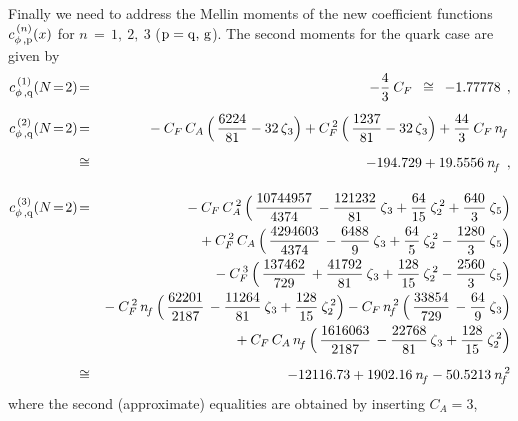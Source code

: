 \documentclass[12pt]{article}
\newcommand{\bea}{\begin{eqnarray}}
\newcommand{\eea}{\end{eqnarray}}
\newcommand{\nn}{\nonumber}
\begin{document}
Finally we need to address the Mellin moments of the new coefficient functions
$c^{\,(n)}_{\rm \phi\, , p}(x)$ for $n\,=\, 1,\:2,\:3$ ($\rm p = q,\,g$).  
The second moments for the quark case are given by
%
\bea
\label{eq:cq1N2}
 c_{\rm \phi\, , q}^{\,(1)} (N\!=\!2) &\! = \! &
        - {4 \over 3}\: \* \cf
 \:\;\cong\:\;  - 1.77778
 \:\: , \\[2mm] 
%
\label{eq:cq2N2}
 c_{\rm \phi\, , q}^{\,(2)} (N\!=\!2) &\! = \! & \mbox{}
       -  \cf\,  \*  \ca\,   \*  \Big( \,
            {6224 \over 81}
          - 32\, \*  \z3
          \Big)
       +  \cfs\,  \*  \Big( \,
            {1237 \over 81}
          - 32\, \*  \z3
          \Big)
       + {44 \over 3}\:  \* \cf\,  \*  \nf\,
 \nn \\[2mm]
   &\!\cong\! & - 194.729 + 19.5556\: \nf
 \:\: , \\[4mm]
%
\label{eq:cq3N2}
 c_{\rm \phi\, , q}^{\,(3)} (N\!=\!2) &\! = \! & \mbox{}
       -  \cf\,  \*  \cas\,  \*  \Big( \,
            {10744957 \over 4374}\,
          - {121232 \over 81}\: \*  \z3
          + {64 \over 15}\: \*  \zss
          + {640 \over 3}\: \*  \z5
          \Big)
%
%
   \nn \\ & & \mbox{}
       +  \cfs\, \*  \ca\,   \*  \Big( \,
            {4294603 \over 4374}\,
          - {6488 \over 9}\: \*  \z3
          + {64 \over 5}\: \*  \zss
          - {1280 \over 3}\: \*  \z5
          \Big)
%
%
   \nn \\ & & \mbox{}
       -  \cft\,  \*  \Big( \,
            {137462 \over 729}\,
          + {41792 \over 81}\: \*  \z3
          + {128 \over 15}\: \*  \zss
          - {2560 \over 3}\: \*  \z5
          \Big)
%
%
   \nn \\ & & \mbox{}
       -  \cfs\, \*  \nf\,   \*  \Big( \,
            {62201 \over 2187}\,
          - {11264 \over 81}\: \*  \z3
          + {128 \over 15}\: \*  \zss
          \Big)
       -  \cf\,  \*  \nfs\,  \*  \Big( \,
            {33854 \over 729}\,
          - {64 \over 9}\: \*  \z3
          \Big)
%
%
   \nn \\ & & \mbox{}
       +  \cf\,  \*  \ca\,  \*  \nf\,   \*  \Big( \,
            {1616063 \over 2187}\,
          - {22768 \over 81}\, \*  \z3
          + {128 \over 15}\: \*  \zss
          \Big)
 \nn \\[2mm]
 &\!\cong\! & - 12116.73 + 1902.16\: \nf - 50.5213\: \nfs
\eea
%
where the second (approximate) equalities are obtained by inserting $C_A=3$, 
\end{document}
